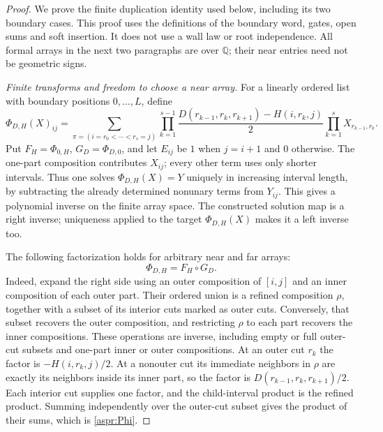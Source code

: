 \begin{proof}
We prove the finite duplication identity used below, including its two
boundary cases. This proof uses the definitions of the boundary word,
gates, open sums and soft insertion. It does not use a wall law or root
independence. All formal arrays in the next two paragraphs are over
$\mathbb Q$; their near entries need not be geometric signs.

\emph{Finite transforms and freedom to choose a near array.}
For a linearly ordered list with boundary positions $0,\ldots,L$, define
\begin{equation}\label{aspr:Phi}
\Phi_{D,H}(X)_{ij}=
\sum_{\pi=(i=r_0<\cdots<r_s=j)}
\prod_{k=1}^{s-1}
\frac{D(r_{k-1},r_k,r_{k+1})-H(i,r_k,j)}2
\prod_{k=1}^sX_{r_{k-1},r_k}.
\end{equation}
Put $F_H=\Phi_{0,H}$, $G_D=\Phi_{D,0}$, and let $E_{ij}$ be $1$ when
$j=i+1$ and $0$ otherwise. The one-part composition contributes $X_{ij}$;
every other term uses only shorter intervals. Thus one solves
$\Phi_{D,H}(X)=Y$ uniquely in increasing interval length, by subtracting
the already determined nonunary terms from $Y_{ij}$. This gives a
polynomial inverse on the finite array space. The constructed solution
map is a right inverse; uniqueness applied to the target
$\Phi_{D,H}(X)$ makes it a left inverse too.

The following factorization holds for arbitrary near and far arrays:
\begin{equation}\label{aspr:factorization}
\Phi_{D,H}=F_H\circ G_D.
\end{equation}
Indeed, expand the right side using an outer composition of $[i,j]$ and
an inner composition of each outer part. Their ordered union is a refined
composition $\rho$, together with a subset of its interior cuts marked as
outer cuts. Conversely, that subset recovers the outer composition, and
restricting $\rho$ to each part recovers the inner compositions. These
operations are inverse, including empty or full outer-cut subsets and
one-part inner or outer compositions. At an outer cut $r_k$ the factor is
$-H(i,r_k,j)/2$. At a nonouter cut its immediate neighbors in $\rho$
are exactly its neighbors inside its inner part, so the factor is
$D(r_{k-1},r_k,r_{k+1})/2$. Each interior cut supplies one factor, and the
child-interval product is the refined product. Summing independently over
the outer-cut subset gives the product of their sums, which is
\eqref{aspr:Phi}.


\end{proof}
